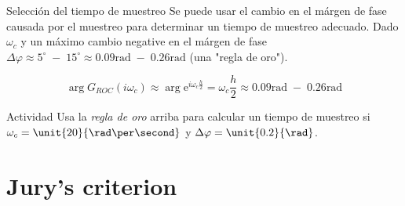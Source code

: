 \documentclass[presentation,aspectratio=169]{beamer}
\begin{document}
\begin{frame}[label={sec:orgf3d4807}]{Selección del tiempo de muestreo}
Se puede usar el cambio en el márgen de fase causada por el muestreo para determinar un tiempo de muestreo adecuado. Dado \(\omega_c\) y un máximo cambio negative en el márgen de fase \(\Delta\varphi \approx 5^\circ\; - \; 15^\circ \approx 0.09 \text{rad}\; - \; 0.26\text{rad}\) (una "regla de oro").

\begin{center}
\end{center}
\[ \arg G_{ROC}(i\omega_c) \approx \arg \mathrm{e}^{i\omega_c \frac{h}{2}} = \omega_c \frac{h}{2} \approx 0.09 \text{rad}\; - \; 0.26\text{rad} \]

\alert{Actividad} Usa la \emph{regla de oro} arriba para calcular un tiempo de muestreo si \(\omega_c = \unit{20}{\rad\per\second}\) y \(\Delta\varphi = \unit{0.2}{\rad}\).
\end{frame}

\section{Jury's criterion}
\label{sec:org173bf3a}
\end{document}
